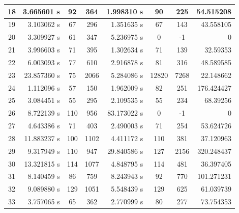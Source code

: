 \documentclass[11pt,a4paper]{article}
\begin{document}
\begin{center}
\begin{tabular}{|c|r|c|c|r|c|c|r|}
		18	& 3.665601 s	& 92	& 364	& 1.998310 s	& 90	& 225	& 54.515208 \\ \hline
		19	& 3.103062 s	& 67	& 296	& 1.351635 s	& 67	& 143	& 43.558105 \\ \hline
		20	& 3.309927 s	& 61	& 347	& 5.236975 s	& 0		& -1	& 0  \\ \hline
		21	& 3.996603 s	& 71	& 395	& 1.302634 s	& 71	& 139	& 32.59353 \\ \hline
		22	& 6.003093 s	& 77	& 610	& 2.916878 s	& 81	& 316	& 48.589585 \\ \hline
		23	& 23.857360 s	& 75	& 2066	& 5.284086 s	& 12820	& 7268	& 22.148662 \\ \hline
		24	& 1.112096 s	& 57	& 150	& 1.962009 s	& 82	& 251	& 176.424427 \\ \hline
		25	& 3.084451 s	& 55	& 295	& 2.109535 s	& 55	& 234	& 68.39256 \\ \hline
		26	& 8.722139 s	& 110	& 956	& 83.173022 s	& 0		& -1	& 0 \\ \hline
		27	& 4.643386 s	& 71	& 403	& 2.490003 s	& 71	& 254	& 53.624726 \\ \hline
		28	& 11.883237 s	& 100	& 1102	& 4.411172 s	& 110	& 381	& 37.120963 \\ \hline
		29	& 9.317949 s	& 110	& 947	& 29.840586 s	& 127	& 2156	& 320.248437 \\ \hline
		30	& 13.321815 s	& 114	& 1077	& 4.848795 s	& 114	& 481	& 36.397405 \\ \hline
		31	& 8.140459 s	& 86	& 759	& 8.243943 s	& 92	& 770	& 101.271231 \\ \hline
		32	& 9.089880 s	& 129	& 1051	& 5.548439 s	& 129	& 625	& 61.039739\\ \hline
		33	& 3.757065 s	& 65	& 362	& 2.770999 s	& 80	& 277	& 73.754353\\ \hline
	\end{tabular}	
\end{center}
\end{document}
